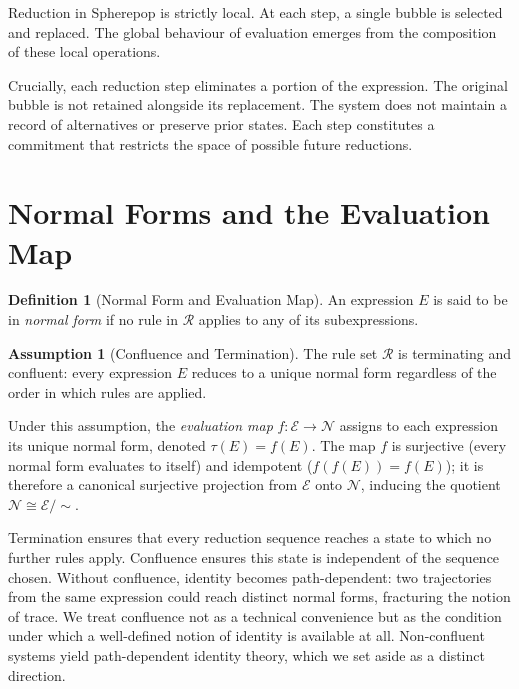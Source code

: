 \documentclass[12pt, oneside]{amsbook}
\theoremstyle{plain}
\theoremstyle{definition}
\newtheorem{definition}[theorem]{Definition}
\newtheorem{assumption}[theorem]{Assumption}
\theoremstyle{remark}
\newcommand{\Expr}{\mathcal{E}}
\newcommand{\NF}{\mathcal{N}}
\newcommand{\evalf}{f}
\newcommand{\trace}{\tau}
\newcommand{\tequiv}{\sim}
\newcommand{\ruleR}{\mathcal{R}}
\begin{document}
Reduction in Spherepop is strictly local. At each step, a single bubble is
selected and replaced. The global behaviour of evaluation emerges from the
composition of these local operations.

Crucially, each reduction step eliminates a portion of the expression. The
original bubble is not retained alongside its replacement. The system does not
maintain a record of alternatives or preserve prior states. Each step
constitutes a commitment that restricts the space of possible future reductions.

\section{Normal Forms and the Evaluation Map}
\label{sec:sp:normalforms}

\begin{definition}[Normal Form and Evaluation Map]
\label{def:sp-normalform}
An expression $E$ is said to be in \emph{normal form} if no rule in $\ruleR$
applies to any of its subexpressions.
\end{definition}

\begin{assumption}[Confluence and Termination]
\label{asm:confluence}
The rule set $\ruleR$ is terminating and confluent: every expression $E$
reduces to a unique normal form regardless of the order in which rules are
applied.
\end{assumption}

Under this assumption, the \emph{evaluation map}
$\evalf : \Expr \to \NF$
assigns to each expression its unique normal form, denoted
$\trace(E) = \evalf(E)$.
The map $\evalf$ is surjective (every normal form evaluates to itself) and
idempotent ($\evalf(\evalf(E)) = \evalf(E)$); it is therefore a canonical
surjective projection from $\Expr$ onto $\NF$, inducing the quotient
$\NF \cong \Expr/{\tequiv}$.

Termination ensures that every reduction sequence reaches a state to which no
further rules apply. Confluence ensures this state is independent of the
sequence chosen. Without confluence, identity becomes path-dependent: two
trajectories from the same expression could reach distinct normal forms,
fracturing the notion of trace. We treat confluence not as a technical
convenience but as the condition under which a well-defined notion of identity
is available at all. Non-confluent systems yield path-dependent identity theory,
which we set aside as a distinct direction.
\end{document}
